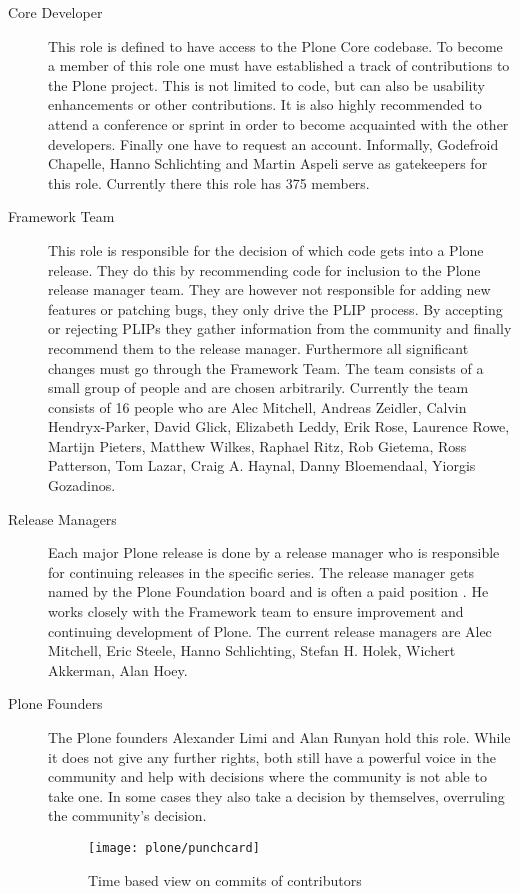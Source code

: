 \begin{description}

  \item[Core Developer] This role is defined to have access to the Plone Core
    codebase. To become a member of this role one must have established a track
    of contributions to the Plone project. This is not limited to code, but can
    also be usability enhancements or other contributions. It is also highly
    recommended to attend a conference or sprint in order to become
    acquainted with the other developers. Finally one have to request an
    account. Informally, Godefroid Chapelle, Hanno Schlichting and Martin
    Aspeli serve as gatekeepers for this role. Currently there this role has
    375 members.

  \item[Framework Team] This role is responsible for the decision of which code
    gets into a Plone release. They do this by recommending code for inclusion
    to the Plone release manager team. They are however not responsible for
    adding new features or patching bugs, they only drive the \ac{PLIP}
    process. By accepting or rejecting \acp{PLIP} they gather information from
    the community and finally recommend them to the release manager.
    Furthermore all significant changes must go through the Framework Team. The
    team consists of a small group of people and are chosen arbitrarily.
    Currently the team consists of 16 people who are Alec Mitchell, Andreas
    Zeidler, Calvin Hendryx-Parker, David Glick, Elizabeth Leddy, Erik Rose,
    Laurence Rowe, Martijn Pieters, Matthew Wilkes, Raphael Ritz, Rob Gietema,
    Ross Patterson, Tom Lazar, Craig A. Haynal, Danny Bloemendaal, Yiorgis
    Gozadinos.

  \item[Release Managers] Each major Plone release is done by a release manager
    who is responsible for continuing releases in the specific series. The
    release manager gets named by the Plone Foundation board and is often a paid
    position \cite{PlonePaidReleaseManager}. He works closely with the Framework
    team to ensure improvement and continuing development of Plone. The current
    release managers are Alec Mitchell, Eric Steele, Hanno Schlichting, Stefan H.
    Holek, Wichert Akkerman, Alan Hoey.

  \item[Plone Founders] The Plone founders Alexander Limi and Alan Runyan hold
    this role. While it does not give any further rights, both still have a
    powerful voice in the community and help with decisions where the community
    is not able to take one. In some cases they also take a decision by
    themselves, overruling the community's decision.

\begin{figure}[hbtp]
  \centering
  \texttt{[image: plone/punchcard]}
  \caption{Time based view on commits of contributors}
\end{figure}

\end{description}

